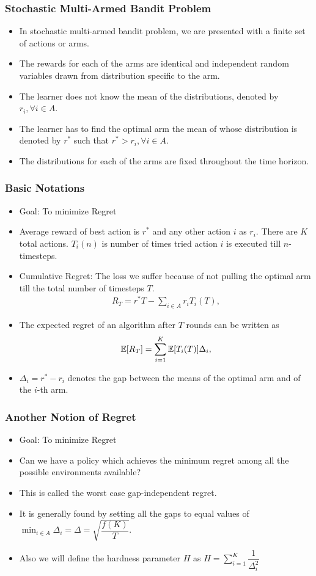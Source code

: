 \begin{frame}
\frametitle{Stochastic Multi-Armed Bandit Problem}
\begin{itemize}
\item<1-> In stochastic multi-armed bandit problem, we are presented with a finite set of actions or arms. 
\item<2-> The rewards for each of the arms are identical and independent random variables drawn from distribution specific to the arm.
\item<3-> The learner does not know the mean of the distributions, denoted by $r_{i},\forall i\in A$. 
\item<4-> The learner has to find the optimal arm the mean of whose distribution is denoted by $r^{*}$ such that $r^{*}> r_{i}, \forall i\in A$.
\item<5-> The distributions for each of the arms are fixed throughout the time horizon. 
\end{itemize}
\end{frame}

\begin{frame}
\frametitle{Basic Notations}
\begin{itemize}
\item<1-> Goal: To minimize Regret
\item<2-> Average reward of best action is $r^{*}$ and any other action $i$ as $r_{i}$. There are $K$ total actions. $T_{i}(n)$ is number of times tried action $i$ is executed till $n$-timesteps.
\item<3-> Cumulative Regret: The loss we suffer because of not pulling the optimal arm till the total number of timesteps  $T$. 
\begin{align*}
R_{T}=r^{*}T - \sum_{i\in A} r_{i}T_{i}(T),
\end{align*}
\item<4-> The expected regret of an algorithm after $T$ rounds can be written as
\begin{align*}
\mathbb{E}[R_{T}]= \sum_{i=1}^K \mathbb{E}[T_{i}(T)] \Delta_i,
\end{align*}
\item<4-> $\Delta_{i}=r^{*}-r_{i}$ denotes the gap between the means of the optimal arm and of the $i$-th arm. 
\end{itemize}
\end{frame}

\begin{frame}
\frametitle{Another Notion of Regret}
\begin{itemize}
\item<1-> Goal: To minimize Regret
\item<2-> Can we have a policy which achieves the minimum regret among all the possible environments available?
\item<3-> This is called the worst case gap-independent regret.
\item<4-> It is generally found by setting all the gaps to equal values of $\min_{i\in A}\Delta_{i}=\Delta=\sqrt{\dfrac{f(K)}{T}}$.
\item<5-> Also we will define the hardness parameter $H$ as $H=\sum_{i=1}^{K}\dfrac{1}{\Delta_{i}^2}$
\end{itemize}
\end{frame}